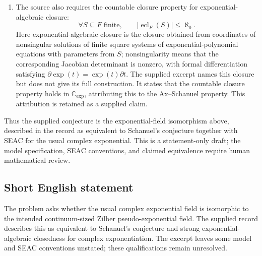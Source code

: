 \documentclass[11pt]{article}
\begin{document}
\begin{enumerate}
\emph{Unresolved qualification:} the excerpt does not define ``free'' or specify irreducibility. The clause above uses explicit irreducible-variety and additive-and-multiplicative-freeness conventions. It retains the excerpt's absence of a dimension restriction. Whether the intended SEAC axiom instead explicitly restricts to \(\dim V=n\), and how that formulation relates to the displayed quantification, requires source review; no equivalence between those formulations is asserted here.
\item The source also requires the countable closure property for exponential-algebraic closure:
\[
\forall S\subseteq F\text{ finite},\qquad
|\operatorname{ecl}_{F}(S)|\leq\aleph_0.
\]
Here exponential-algebraic closure is the closure obtained from coordinates of nonsingular solutions of finite square systems of exponential-polynomial equations with parameters from \(S\); nonsingularity means that the corresponding Jacobian determinant is nonzero, with formal differentiation satisfying \(\partial\exp(t)=\exp(t)\partial t\). The supplied excerpt names this closure but does not give its full construction. It states that the countable closure property holds in \(\mathbb C_{\exp}\), attributing this to the Ax--Schanuel property. This attribution is retained as a supplied claim.
\end{enumerate}
Thus the supplied conjecture is the exponential-field isomorphism above, described in the record as equivalent to Schanuel's conjecture together with SEAC for the usual complex exponential. This is a statement-only draft; the model specification, SEAC conventions, and claimed equivalence require human mathematical review.
\subsection{Short English statement}
The problem asks whether the usual complex exponential field is isomorphic to the intended continuum-sized Zilber pseudo-exponential field. The supplied record describes this as equivalent to Schanuel's conjecture and strong exponential-algebraic closedness for complex exponentiation. The excerpt leaves some model and SEAC conventions unstated; these qualifications remain unresolved.
\end{document}
